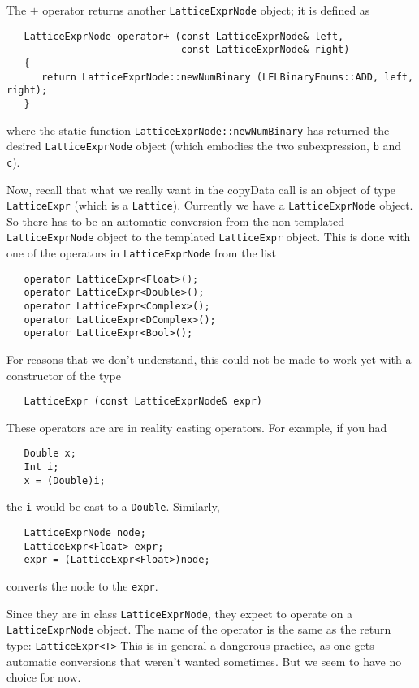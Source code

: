 The $+$ operator returns another {\tt LatticeExprNode} object; it is defined as

\begin{verbatim}
   LatticeExprNode operator+ (const LatticeExprNode& left,
                              const LatticeExprNode& right)
   {
      return LatticeExprNode::newNumBinary (LELBinaryEnums::ADD, left, right);
   }
\end{verbatim}

where the static function {\tt LatticeExprNode::newNumBinary} has returned the
desired {\tt LatticeExprNode} object (which embodies the two subexpression, {\tt b} and
{\tt c}).

Now, recall that what we really want in the copyData call is an object
of type {\tt LatticeExpr} (which is a {\tt Lattice}).  Currently we have a
{\tt LatticeExprNode} object.  So there has to be an automatic conversion 
from the non-templated {\tt LatticeExprNode} object to the templated {\tt LatticeExpr}
object.   This is done with one of the operators in {\tt LatticeExprNode}
from the list

\begin{verbatim}
   operator LatticeExpr<Float>();
   operator LatticeExpr<Double>();
   operator LatticeExpr<Complex>();
   operator LatticeExpr<DComplex>();
   operator LatticeExpr<Bool>();
\end{verbatim}

For reasons that we don't understand, this could not be made to
work yet with a constructor of the type

\begin{verbatim}
   LatticeExpr (const LatticeExprNode& expr)
\end{verbatim}


These operators are are in reality casting operators.    For example,
if you had

\begin{verbatim}
   Double x; 
   Int i;  
   x = (Double)i;
\end{verbatim}

the {\tt i} would be cast to a {\tt Double}.  Similarly, 

\begin{verbatim}
   LatticeExprNode node; 
   LatticeExpr<Float> expr; 
   expr = (LatticeExpr<Float>)node;
\end{verbatim}

converts the node to the {\tt expr}.

Since they are in class {\tt LatticeExprNode}, they expect to operate on a
{\tt LatticeExprNode} object.  The name of the operator is the same as the
return type: {\tt LatticeExpr<T>} This is in general a dangerous practice, as
one gets automatic conversions that weren't wanted sometimes.  But we
seem to have no choice for now. 

